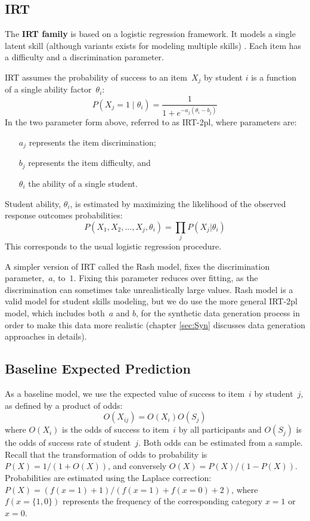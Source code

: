 \subsection{IRT} 

The \textbf{IRT family} is based on a logistic regression framework. It models a single latent skill (although variants exists for modeling multiple skills) \citep{bakerKim2004}.  Each item has a difficulty and a discrimination parameter.

IRT assumes the probability of success to an item~$X_j$ by student $i$ is a function of a single ability factor~$\theta_i$: 
\[P(X_j\!=\!1\;|\;\theta_i) = \frac{1}{1+e^{-a_j(\theta_i-b_j)}}\]
In the two parameter form above, referred to as IRT-2pl, where parameters are:

\begin{itemize}
\item[$a_j$] represents the item discrimination;
\item [$b_j$] represents the item difficulty, and
\item [$\theta_i$] the ability of a single student.
\end{itemize}

Student ability, $\theta_i$, is estimated by maximizing the likelihood of the observed response outcomes probabilities:
\[ P(X_1, X_2, ..., X_j, \theta_i) = \prod_j P(X_j|\theta_i) \]
This corresponds to the usual logistic regression procedure.

A simpler version of IRT called the Rash model, fixes the discrimination parameter,~$a$, to~$1$.  Fixing this parameter reduces over fitting, as the discrimination can sometimes take unrealistically large values. Rash model is a valid model for student skills modeling, but we do use the more general IRT-2pl model, which includes both~$a$ and $b$, for the synthetic data generation process in order to make this data more realistic (chapter \ref{sec:Syn} discusses data generation approaches in details).


\subsection{Baseline Expected Prediction}\label{sec:basel-expect-pred}

As a baseline model, we use the expected value of success to item~$i$ by student~$j$, as defined by a product of odds:
\[ O(X_{ij}) =  O(X_i) O(S_j) \]
where $O(X_i)$ is the odds of success to item~$i$ by all participants and $O(S_j)$ is the odds of success rate of student~$j$.  Both odds can be estimated from a sample.  Recall that the transformation of odds to probability is $P(X) = 1/(1+O(X))$, and conversely $O(X) = P(X)/(1 - P(X))$. Probabilities are estimated using the Laplace correction: $P(X) = (f(x\!=\!1) + 1) / (f(x\!=\!1) + f(x\!=\!0) + 2)$, where $f(x=\{1,0\})$ represents the frequency of the corresponding category $x=1$ or $x=0$.


